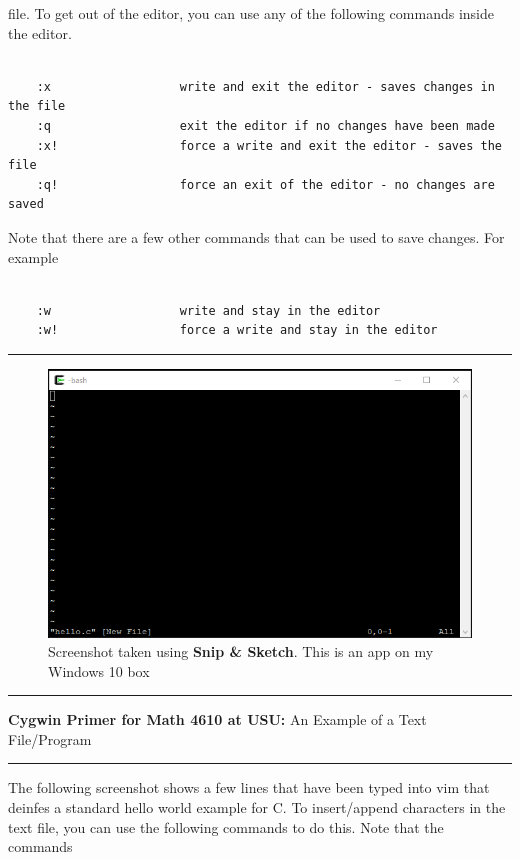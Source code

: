 \documentclass[10pt,fleqn]{article}
\begin{document}
file. To get out of the editor, you can use any of the following commands inside
the editor.
\begin{verbatim}

    :x                  write and exit the editor - saves changes in the file
    :q                  exit the editor if no changes have been made
    :x!                 force a write and exit the editor - saves the file
    :q!                 force an exit of the editor - no changes are saved

\end{verbatim}
Note that there are a few other commands that can be used to save changes. For
example
\begin{verbatim}

    :w                  write and stay in the editor
    :w!                 force a write and stay in the editor

\end{verbatim}
\vskip0.1in\hrule\vskip0.1in
\vfill
\begin{figure}[h]
\centering
\includegraphics{./images/cygwin_06.png}
\caption{{Screenshot} taken using {\bf Snip \& Sketch}. This is an app on
         my Windows 10 box}
\end{figure}
\eject
\vskip0.1in\hrule\vskip0.1in
\noindent
{{\bf Cygwin Primer for Math 4610 at USU:} An Example of a Text File/Program} 
\vskip0.1in\hrule\vskip0.1in
\noindent
The following screenshot shows a few lines that have been typed into vim that
deinfes a standard hello world example for C. To insert/append characters in the
text file, you can use the following commands to do this. Note that the commands
\end{document}
